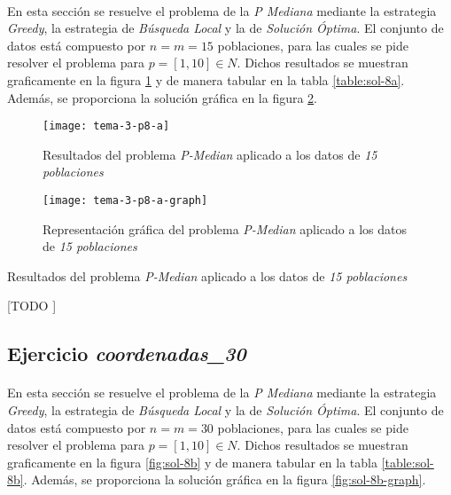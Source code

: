 \documentclass[spanish]{article}
\begin{document}
			\paragraph{}
			En esta sección se resuelve el problema de la \emph{P Mediana} mediante la estrategia \emph{Greedy}, la estrategia de \emph{Búsqueda Local} y la de \emph{Solución Óptima}. El conjunto de datos está compuesto por $n = m = 15$ poblaciones, para las cuales se pide resolver el problema para $p = [1,10] \in N$. Dichos resultados se muestran graficamente en la figura \ref{fig:sol-8a} y de manera tabular en la tabla \ref{table:sol-8a}. Además, se proporciona la solución gráfica en la figura \ref{fig:sol-8a-graph}.

			\begin{figure}[h]
				\begin{center}
					\texttt{[image: tema-3-p8-a]}
				\end{center}
				\caption{Resultados del problema \emph{P-Median} aplicado a los datos de \emph{15 poblaciones}}
				\label{fig:sol-8a}
			\end{figure}

			\begin{figure}[h]
				\begin{center}
					\texttt{[image: tema-3-p8-a-graph]}
				\end{center}
				\caption{Representación gráfica del problema \emph{P-Median} aplicado a los datos de \emph{15 poblaciones}}
				\label{fig:sol-8a-graph}
			\end{figure}

			\begin{table}[h]
				\begin{center}
					\caption{Resultados del problema \emph{P-Median} aplicado a los datos de \emph{15 poblaciones}}
				\end{center}
				\caption{[TODO ]}
				\label{table:sol-8a}
			\end{table}


		\subsection{Ejercicio \emph{coordenadas\_30}}
		\label{sec:e-8b}

			\paragraph{}
			En esta sección se resuelve el problema de la \emph{P Mediana} mediante la estrategia \emph{Greedy}, la estrategia de \emph{Búsqueda Local} y la de \emph{Solución Óptima}. El conjunto de datos está compuesto por $n = m = 30$ poblaciones, para las cuales se pide resolver el problema para $p = [1,10] \in N$. Dichos resultados se muestran graficamente en la figura \ref{fig:sol-8b} y de manera tabular en la tabla \ref{table:sol-8b}. Además, se proporciona la solución gráfica en la figura \ref{fig:sol-8b-graph}.
\end{document}
